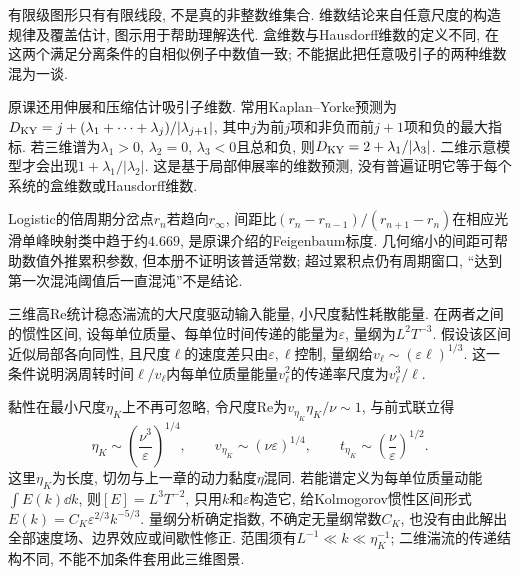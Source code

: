 
有限级图形只有有限线段, 不是真的非整数维集合. 维数结论来自任意尺度的构造规律及覆盖估计, 图示用于帮助理解迭代. 盒维数与Hausdorff维数的定义不同, 在这两个满足分离条件的自相似例子中数值一致; 不能据此把任意吸引子的两种维数混为一谈.

原课还用伸展和压缩估计吸引子维数. 常用Kaplan--Yorke预测为$D_{\rm KY}=j+(\lambda_1+\cdots+\lambda_j)/|\lambda_{j+1}|$, 其中$j$为前$j$项和非负而前$j+1$项和负的最大指标. 若三维谱为$\lambda_1>0$, $\lambda_2=0$, $\lambda_3<0$且总和负, 则$D_{\rm KY}=2+\lambda_1/|\lambda_3|$. 二维示意模型才会出现$1+\lambda_1/|\lambda_2|$. 这是基于局部伸展率的维数预测, 没有普遍证明它等于每个系统的盒维数或Hausdorff维数.

Logistic的倍周期分岔点$r_n$若趋向$r_\infty$, 间距比$(r_n-r_{n-1})/(r_{n+1}-r_n)$在相应光滑单峰映射类中趋于约$4.669$, 是原课介绍的Feigenbaum标度. 几何缩小的间距可帮助数值外推累积参数, 但本册不证明该普适常数; 超过累积点仍有周期窗口, “达到第一次混沌阈值后一直混沌”不是结论.

三维高Re统计稳态湍流的大尺度驱动输入能量, 小尺度黏性耗散能量. 在两者之间的惯性区间, 设每单位质量、每单位时间传递的能量为$\varepsilon$, 量纲为$L^2T^{-3}$. 假设该区间近似局部各向同性, 且尺度$\ell$的速度差只由$\varepsilon,\ell$控制, 量纲给$v_\ell\sim(\varepsilon\ell)^{1/3}$. 这一条件说明涡周转时间$\ell/v_\ell$内每单位质量能量$v_\ell^2$的传递率尺度为$v_\ell^3/\ell$.

黏性在最小尺度$\eta_K$上不再可忽略, 令尺度Re为$v_{\eta_K}\eta_K/\nu\sim1$, 与前式联立得
\[
\eta_K\sim\left(\frac{\nu^3}{\varepsilon}\right)^{1/4},\qquad
v_{\eta_K}\sim(\nu\varepsilon)^{1/4},\qquad
t_{\eta_K}\sim\left(\frac\nu\varepsilon\right)^{1/2}.
\]
这里$\eta_K$为长度, 切勿与上一章的动力黏度$\eta$混同. 若能谱定义为每单位质量动能$\int E(k)\dd k$, 则$[E]=L^3T^{-2}$, 只用$k$和$\varepsilon$构造它, 给Kolmogorov惯性区间形式$E(k)=C_K\varepsilon^{2/3}k^{-5/3}$. 量纲分析确定指数, 不确定无量纲常数$C_K$, 也没有由此解出全部速度场、边界效应或间歇性修正. 范围须有$L^{-1}\ll k\ll\eta_K^{-1}$; 二维湍流的传递结构不同, 不能不加条件套用此三维图景.
